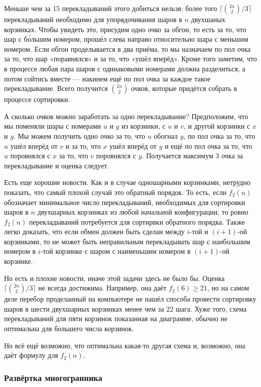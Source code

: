 Меньше чем за 15 перекладываний этого добиться нельзя; более того $\lceil\binom{2n}{2}/3\rceil$ перекладываний необходимо для упорядочивания шаров в $n$ двухшаных корзинках.
Чтобы увидеть это, присудим одно очко за обгон, то есть за то, что шар с б\'{о}льшим номером, прошёл слева направо относительно шара с меньшим номером.
Если обгон проделывается в два приёма, то мы назначаем по пол очка за то, что шар «поравнялся» и за то, что «ушёл вперёд».
Кроме того заметим, что в процессе любая пара шаров с одинаковыми номерами должна разделиться, а потом сойтись вместе --- накинем ещё по пол очка за каждое такое перекладывание. 
Всего получится $\binom{2n}2$ очков, которые придётся собрать в процессе сортировки.

А сколько очков можно заработать за одно перекладывание?
Предположим, что мы поменяли шары с номерами $u$ и $y$ из корзинки, с $u$ и $v$, и другой корзинки с $x$ и $y$.
Мы можем получить одно очко за то, что $u$ обогнал $y$,
по пол очка за то, что $u$ ушёл вперёд от $v$
и за то, что $x$ ушёл вперёд от $y$
и ещё по пол очка за то, что $u$ поровнялся с $x$ 
за то, что $v$ поровнялся с $y$.
Получается максимум 3 очка за перекладывание и оценка следует.


Есть еще хорошие новости.
Как и в случае одношарными корзинками, нетрудно показать, что самый плохой случай это обратный порядок.
То есть, если $f_2(n)$ обозначает минимальное число перекладываний, необходимых для сортировки шаров в $n$ двухшарных корзинках из любой начальной конфигурации, то ровно $f_2(n)$ перекладываний потребуется для сортирвки обратного порядка.
Также легко доказать, что если обмен должен быть сделан между $i$-той и $(i+1)$-ой корзинками, то не может быть неправильным перекладывать шар с наибольшим номером в $i$-той корзинке с шаром с наименьшим номером в $(i+1)$-ой корзинке.

Но есть и плохие новости, иначе этой задачи здесь не было бы.
Оценка $\lceil\binom{2n}{2}/3\rceil$ не всегда достижима.
Например, она даёт $f_2(6)\ge 21$, но на самом деле перебор проделанный на компьютере не нашёл способа провести сортировку шаров в шести двухшарных корзинках менее чем за 22 шага.
Хуже того, схема перекладываний для пяти корзинок показанная на диаграмме, обычно не оптимальна для большего числа корзинок.

Но всё ещё возможно, что оптимальна какая-то другая схема и, возможно, она даёт формулу для $f_2(n)$.

\subsubsection*{Развёртка многогранника}

